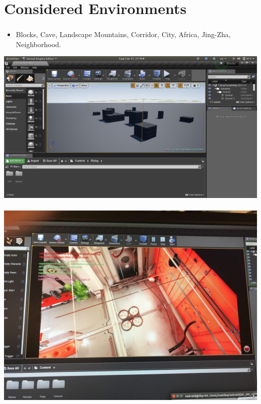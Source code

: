 \documentclass[t]{beamer}
\begin{document}
\section{Considered Environments}

\begin{frame}
	\frametitle{\insertsection}
	\begin{itemize}
		\item Blocks, Cave, Landscape Mountains, Corridor, City, Africa, Jing-Zha, Neighborhood.
	\end{itemize}
	\includegraphics[scale=0.1]{images/blocks.png} $\quad$
	\includegraphics[scale=0.1]{images/corridor.jpg}


\end{frame}
\end{document}
